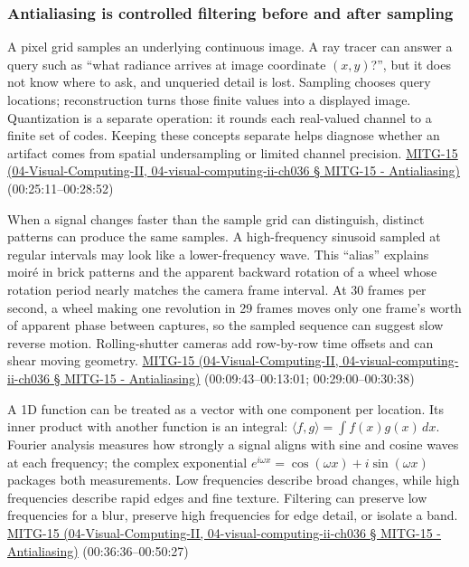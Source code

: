 \subsubsection{Antialiasing is controlled filtering before and after sampling}\label{antialiasing-is-controlled-filtering-before-and-after-sampling}

A pixel grid samples an underlying continuous image. A ray tracer can answer a query such as ``what radiance arrives at image coordinate \((x,y)\)?'', but it does not know where to ask, and unqueried detail is lost. Sampling chooses query locations; reconstruction turns those finite values into a displayed image. Quantization is a separate operation: it rounds each real-valued channel to a finite set of codes. Keeping these concepts separate helps diagnose whether an artifact comes from spatial undersampling or limited channel precision. \href{}{MITG-15 (04-Visual-Computing-II, 04-visual-computing-ii-ch036 § MITG-15 - Antialiasing)} (00:25:11--00:28:52)

When a signal changes faster than the sample grid can distinguish, distinct patterns can produce the same samples. A high-frequency sinusoid sampled at regular intervals may look like a lower-frequency wave. This ``alias'' explains moiré in brick patterns and the apparent backward rotation of a wheel whose rotation period nearly matches the camera frame interval. At 30 frames per second, a wheel making one revolution in 29 frames moves only one frame's worth of apparent phase between captures, so the sampled sequence can suggest slow reverse motion. Rolling-shutter cameras add row-by-row time offsets and can shear moving geometry. \href{}{MITG-15 (04-Visual-Computing-II, 04-visual-computing-ii-ch036 § MITG-15 - Antialiasing)} (00:09:43--00:13:01; 00:29:00--00:30:38)

A 1D function can be treated as a vector with one component per location. Its inner product with another function is an integral: \(\langle f,g\rangle=\int f(x)g(x)\,dx\). Fourier analysis measures how strongly a signal aligns with sine and cosine waves at each frequency; the complex exponential \(e^{i\omega x}=\cos(\omega x)+i\sin(\omega x)\) packages both measurements. Low frequencies describe broad changes, while high frequencies describe rapid edges and fine texture. Filtering can preserve low frequencies for a blur, preserve high frequencies for edge detail, or isolate a band. \href{}{MITG-15 (04-Visual-Computing-II, 04-visual-computing-ii-ch036 § MITG-15 - Antialiasing)} (00:36:36--00:50:27)

